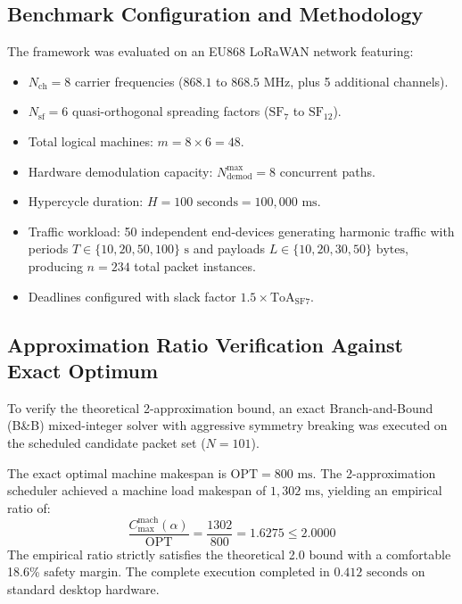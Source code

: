 \documentclass{article}
\begin{document}
\subsection{Benchmark Configuration and Methodology}
The framework was evaluated on an EU868 LoRaWAN network featuring:
\begin{itemize}
    \item $N_{\text{ch}} = 8$ carrier frequencies ($868.1$ to $868.5\text{ MHz}$, plus 5 additional channels).
    \item $N_{\text{sf}} = 6$ quasi-orthogonal spreading factors ($\text{SF}_7$ to $\text{SF}_{12}$).
    \item Total logical machines: $m = 8 \times 6 = 48$.
    \item Hardware demodulation capacity: $N_{\text{demod}}^{\max} = 8$ concurrent paths.
    \item Hypercycle duration: $H = 100\text{ seconds} = 100{,}000\text{ ms}$.
    \item Traffic workload: 50 independent end-devices generating harmonic traffic with periods $T \in \{10, 20, 50, 100\}\text{ s}$ and payloads $L \in \{10, 20, 30, 50\}\text{ bytes}$, producing $n = 234$ total packet instances.
    \item Deadlines configured with slack factor $1.5 \times \text{ToA}_{\text{SF7}}$.
\end{itemize}

\subsection{Approximation Ratio Verification Against Exact Optimum}
To verify the theoretical 2-approximation bound, an exact Branch-and-Bound (B\&B) mixed-integer solver with aggressive symmetry breaking was executed on the scheduled candidate packet set ($N = 101$).

The exact optimal machine makespan is $\text{OPT} = 800\text{ ms}$. The 2-approximation scheduler achieved a machine load makespan of $1{,}302\text{ ms}$, yielding an empirical ratio of:
\begin{equation}
\frac{C_{\max}^{\text{mach}}(\alpha)}{\text{OPT}} = \frac{1302}{800} = \mathbf{1.6275} \le \mathbf{2.0000}
\end{equation}
The empirical ratio strictly satisfies the theoretical 2.0 bound with a comfortable 18.6\% safety margin. The complete execution completed in $0.412\text{ seconds}$ on standard desktop hardware.
\end{document}
